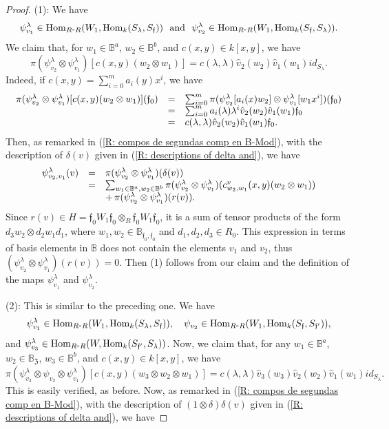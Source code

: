 \documentclass{article}
\theoremstyle{definition}
\newcommand{\Hom}{{ \rm Hom }}
\renewcommand{\frak}{\mathfrak}
\newcommand{\g}{\hbox{-}}
\newcommand{\hueca}[1]{\mathbb{#1}}
\begin{document}
\begin{proof} (1): We have
$$\psi^\lambda_{v_1}\in \Hom_{R\g R}(W_1,\Hom_k(S_\lambda,S_{\frak{f}})) \hbox{ \ and \ } \psi^\lambda_{v_2}\in \Hom_{R\g R}(W_1,\Hom_k(S_{\frak{f}},S_\lambda)).$$
We claim that, for  $w_1\in \hueca{B}^a$, $w_2\in \hueca{B}^b$, and  $c(x,y)\in k[x,y]$, we have 
$$\pi (\psi^\lambda_{v_2}\otimes\psi^\lambda_{v_1})[c(x,y)(w_2\otimes w_1)]=c(\lambda,\lambda)\hat{v}_2(w_2)\hat{v}_1(w_1)id_{S_\lambda}.$$  
Indeed, if $c(x,y)=\sum_{i=0}^ma_i(y)x^i$, we have
$$\begin{matrix}
\pi (\psi^\lambda_{v_2}\otimes\psi^\lambda_{v_1})[c(x,y)(w_2\otimes w_1)](\frak{f}_0)
&=&
\sum_{i=0}^m\pi(\psi^\lambda_{v_2}[a_i(x)w_2]\otimes \psi^\lambda_{v_1}[w_1x^i])(\frak{f}_0)\hfill\\
&=&
\sum_{i=0}^ma_i(\lambda)\lambda^i\hat{v}_2(w_2)\hat{v}_1(w_1)\frak{f}_0\hfill\\
&=&
c(\lambda,\lambda)\hat{v}_2(w_2)\hat{v}_1(w_1)\frak{f}_0.\hfill\\
\end{matrix}$$
Then, as remarked in (\ref{R: compos de segundas comp en B-Mod}), with the description of $\delta(v)$ given  in (\ref{R: descriptions of delta and}), we have 
$$\begin{matrix} 
\psi^\lambda_{v_2,v_1}(v)&=&\pi (\psi^\lambda_{v_2}\otimes\psi^\lambda_{v_1})(\delta(v))\hfill\\
&=&
\sum_{w_1\in \hueca{B}^a,w_2\in \hueca{B}^b}\pi (\psi^\lambda_{v_2}\otimes\psi^\lambda_{v_1})(c^v_{w_2,w_1}(x,y)(w_2\otimes w_1))\hfill\\
&&+\,\pi (\psi^\lambda_{v_2}\otimes\psi^\lambda_{v_1})(r(v)).\hfill\\
\end{matrix}$$
Since $r(v)\in H =\frak{f}_0W_1\frak{f}_0\otimes_{R}\frak{f}_0W_1\frak{f}_0$, it is a sum of tensor products of the form $d_3w_2\otimes d_2 w_1d_1$, where $w_1,w_2\in \hueca{B}_{\frak{f}_0,\frak{f}_0}$ and $d_1,d_2,d_3\in R_0$. This expression in terms of  basis  elements in $\hueca{B}$ does not contain the elements $v_1$ and $v_2$, thus  $(\psi^\lambda_{v_2}\otimes\psi^\lambda_{v_1})(r(v))=0$.  Then (1) follows from our claim and the definition of the maps $\psi_{v_1}^\lambda$ and $\psi_{v_2}^\lambda$. 
\medskip

\noindent(2): This is similar to the preceding one. We have 
$$\psi^\lambda_{v_1}\in 
\Hom_{R\g R}(W_1,\Hom_k(S_\lambda,S_{\frak{f}})), 
\hbox{ \  \ } \psi_{v_2}\in 
\Hom_{R\g R}(W_1,\Hom_k(S_{\frak{f}},S_{\frak{f}'})),$$
and 
$\psi^\lambda_{v_3}\in 
\Hom_{R\g R}(W,\Hom_k(S_{\frak{f}'},S_\lambda))$. 
Now, we claim that, for any $w_1\in \hueca{B}^a$, $w_2\in \hueca{B}_{\frak{Z}}$, $w_3\in \hueca{B}^b$, and   $c(x,y)\in k[x,y]$, we have 
$$\pi (\psi^\lambda_{v_3}\otimes\psi_{v_2}\otimes\psi^\lambda_{v_1})[c(x,y)(w_3\otimes w_2\otimes w_1)]=c(\lambda,\lambda)\hat{v}_3(w_3)\hat{v}_2(w_2)\hat{v}_1(w_1)id_{S_\lambda}.$$ 
This is easily verified, as before.   
Now, as remarked in (\ref{R: compos de segundas comp en B-Mod}), with the description of $(1\otimes\delta)\delta(v)$ given  in (\ref{R: descriptions of delta and}), we have 


\end{proof}
\end{document}
